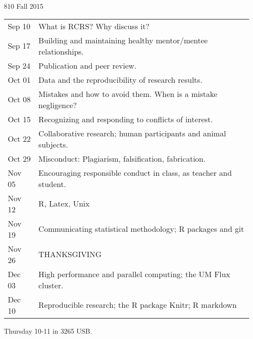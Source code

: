 \documentclass[12pt]{article}\usepackage[]{graphicx}\usepackage[]{color}
\begin{document}
\begin{center}
{\LARGE 810 Fall 2015}

\medskip

\begin{tabular}{|ll|}
   \hline
Sep 10 & What is RCRS? Why discuss it? \\ 
  Sep 17 & Building and maintaining healthy mentor/mentee relationships. \\ 
  Sep 24 & Publication and peer review. \\ 
  Oct 01 & Data and the reproducibility of research results. \\ 
  Oct 08 & Mistakes and how to avoid them. When is a mistake negligence? \\ 
  Oct 15 & Recognizing and responding to conflicts of interest. \\ 
  Oct 22 & Collaborative research; human participants and animal subjects. \\ 
  Oct 29 & Misconduct: Plagiarism, falsification, fabrication. \\ 
  Nov 05 & Encouraging responsible conduct in class, as teacher and student. \\ 
  Nov 12 & R, Latex, Unix \\ 
  Nov 19 & Communicating statistical methodology; R packages and git \\ 
  Nov 26 & THANKSGIVING \\ 
  Dec 03 & High performance and parallel computing; the UM Flux cluster. \\ 
  Dec 10 & Reproducible research; the R package Knitr; R markdown \\ 
   \hline
\end{tabular}


\medskip

Thursday 10-11 in 3265 USB. 

\end{center}
\end{document}
